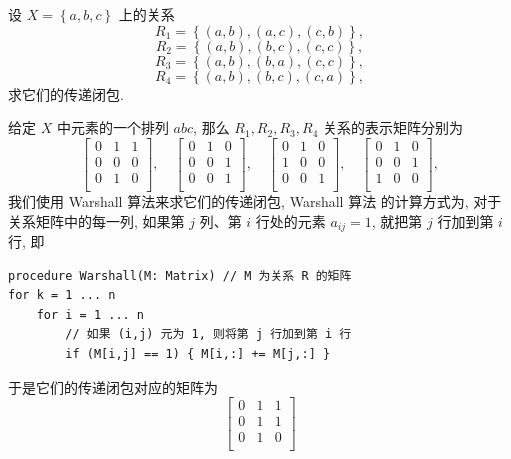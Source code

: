 \documentclass[10pt,UTF8]{book} %
\begin{document}
\begin{exercise}
    设 $X = \left\{ a,b,c \right\}$ 上的关系
    \[ R_1 = \left\{ (a,b), (a,c), (c,b) \right\}, \]
    \[ R_2 = \left\{ (a,b), (b,c), (c,c) \right\}, \]
    \[ R_3 = \left\{ (a,b), (b,a), (c,c) \right\}, \]
    \[ R_4 = \left\{ (a,b), (b,c), (c,a) \right\}, \]
    求它们的传递闭包.
    \begin{sol}
        给定 $X$ 中元素的一个排列 $abc$, 那么 $R_1, R_2, R_3, R_4$
        关系的表示矩阵分别为
        \[ \begin{bmatrix}
            0 & 1 & 1 \\
            0 & 0 & 0 \\
            0 & 1 & 0 \\
        \end{bmatrix}, \quad 
        \begin{bmatrix}
            0 & 1 & 0 \\
            0 & 0 & 1 \\
            0 & 0 & 1 \\
        \end{bmatrix}, \quad 
        \begin{bmatrix}
            0 & 1 & 0 \\
            1 & 0 & 0 \\
            0 & 0 & 1 \\
        \end{bmatrix}, \quad 
        \begin{bmatrix}
            0 & 1 & 0 \\
            0 & 0 & 1 \\
            1 & 0 & 0 \\
        \end{bmatrix}, \]
        我们使用 Warshall 算法来求它们的传递闭包, Warshall 算法
        的计算方式为, {\kaishu 对于关系矩阵中的每一列,
        如果第 $j$ 列、第 $i$ 行处的元素 $a_{ij} = 1$,
        就把第 $j$ 行加到第 $i$ 行}, 即
\begin{lstlisting}
procedure Warshall(M: Matrix) // M 为关系 R 的矩阵
for k = 1 ... n
    for i = 1 ... n     
        // 如果 (i,j) 元为 1, 则将第 j 行加到第 i 行
        if (M[i,j] == 1) { M[i,:] += M[j,:] }
\end{lstlisting}
    于是它们的传递闭包对应的矩阵为
    \[ \begin{bmatrix}
        0 & 1 & 1 \\
        0 & 1 & 1 \\
        0 & 1 & 0 \\

\end{bmatrix}\]
\end{sol}
\end{exercise}
\end{document}
